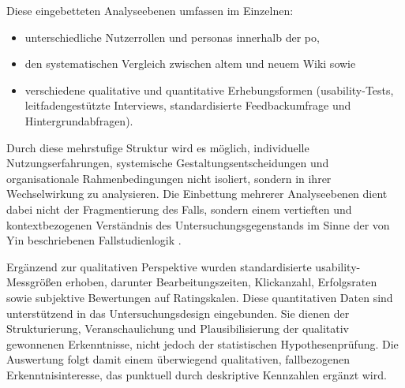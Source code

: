 Diese eingebetteten Analyseebenen umfassen im Einzelnen:
\begin{itemize}
    \item unterschiedliche Nutzerrollen und \Gls{personas} innerhalb der \acrlong{po},
    \item den systematischen Vergleich zwischen altem und neuem Wiki sowie
    \item verschiedene qualitative und quantitative Erhebungsformen (\Gls{usability}-Tests, leitfadengestützte Interviews, standardisierte Feedbackumfrage und Hintergrundabfragen).
\end{itemize}

Durch diese mehrstufige Struktur wird es möglich, individuelle Nutzungserfahrungen, systemische Gestaltungsentscheidungen und organisationale Rahmenbedingungen nicht isoliert, sondern in ihrer Wechselwirkung zu analysieren. Die Einbettung mehrerer Analyseebenen dient dabei nicht der Fragmentierung des Falls, sondern einem vertieften und kontextbezogenen Verständnis des Untersuchungsgegenstands im Sinne der von Yin beschriebenen Fallstudienlogik \cite{404:Yin2018}.

Ergänzend zur qualitativen Perspektive wurden standardisierte \Gls{usability}-Messgrößen erhoben, darunter Bearbeitungszeiten, Klickanzahl, Erfolgsraten sowie subjektive Bewertungen auf Ratingskalen. Diese quantitativen Daten sind unterstützend in das Untersuchungsdesign eingebunden. Sie dienen der Strukturierung, Veranschaulichung und Plausibilisierung der qualitativ gewonnenen Erkenntnisse, nicht jedoch der statistischen Hypothesenprüfung. Die Auswertung folgt damit einem überwiegend qualitativen, fallbezogenen Erkenntnisinteresse, das punktuell durch deskriptive Kennzahlen ergänzt wird.
